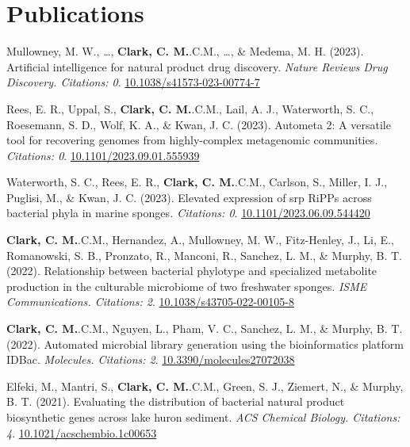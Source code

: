 \documentclass[11pt,a4paper,]{awesome-cv}
\begin{document}
\hypertarget{publications}{%
\section{Publications}\label{publications}}

\hypertarget{bibliography}{}
\leavevmode{}%
Mullowney, M. W., \ldots, \textbf{Clark, C. M.}.C.M., \ldots, \& Medema,
M. H. (2023). Artificial intelligence for natural product drug
discovery. \emph{Nature Reviews Drug Discovery. Citations: 0}.
\href{https://10.1038/s41573-023-00774-7}{10.1038/s41573-023-00774-7}

\leavevmode{}%
Rees, E. R., Uppal, S., \textbf{Clark, C. M.}.C.M., Lail, A. J.,
Waterworth, S. C., Roesemann, S. D., Wolf, K. A., \& Kwan, J. C. (2023).
Autometa 2: A versatile tool for recovering genomes from highly-complex
metagenomic communities\emph{. Citations: 0}.
\href{https://10.1101/2023.09.01.555939}{10.1101/2023.09.01.555939}

\leavevmode{}%
Waterworth, S. C., Rees, E. R., \textbf{Clark, C. M.}.C.M., Carlson, S.,
Miller, I. J., Puglisi, M., \& Kwan, J. C. (2023). Elevated expression
of srp RiPPs across bacterial phyla in marine sponges\emph{. Citations:
0}. \href{https://10.1101/2023.06.09.544420}{10.1101/2023.06.09.544420}

\leavevmode{}%
\textbf{Clark, C. M.}.C.M., Hernandez, A., Mullowney, M. W.,
Fitz-Henley, J., Li, E., Romanowski, S. B., Pronzato, R., Manconi, R.,
Sanchez, L. M., \& Murphy, B. T. (2022). Relationship between bacterial
phylotype and specialized metabolite production in the culturable
microbiome of two freshwater sponges. \emph{ISME Communications.
Citations: 2}.
\href{https://10.1038/s43705-022-00105-8}{10.1038/s43705-022-00105-8}

\leavevmode{}%
\textbf{Clark, C. M.}.C.M., Nguyen, L., Pham, V. C., Sanchez, L. M., \&
Murphy, B. T. (2022). Automated microbial library generation using the
bioinformatics platform IDBac. \emph{Molecules. Citations: 2}.
\href{https://10.3390/molecules27072038}{10.3390/molecules27072038}

\leavevmode{}%
Elfeki, M., Mantri, S., \textbf{Clark, C. M.}.C.M., Green, S. J.,
Ziemert, N., \& Murphy, B. T. (2021). Evaluating the distribution of
bacterial natural product biosynthetic genes across lake huron sediment.
\emph{ACS Chemical Biology. Citations: 4}.
\href{https://10.1021/acschembio.1c00653}{10.1021/acschembio.1c00653}
\end{document}
